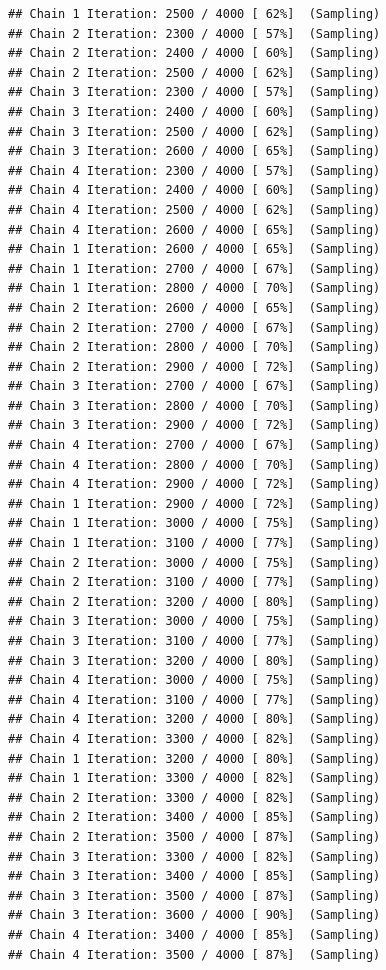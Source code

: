 \documentclass[
]{article}
\begin{document}
\begin{verbatim}
## Chain 1 Iteration: 2500 / 4000 [ 62%]  (Sampling) 
## Chain 2 Iteration: 2300 / 4000 [ 57%]  (Sampling) 
## Chain 2 Iteration: 2400 / 4000 [ 60%]  (Sampling) 
## Chain 2 Iteration: 2500 / 4000 [ 62%]  (Sampling) 
## Chain 3 Iteration: 2300 / 4000 [ 57%]  (Sampling) 
## Chain 3 Iteration: 2400 / 4000 [ 60%]  (Sampling) 
## Chain 3 Iteration: 2500 / 4000 [ 62%]  (Sampling) 
## Chain 3 Iteration: 2600 / 4000 [ 65%]  (Sampling) 
## Chain 4 Iteration: 2300 / 4000 [ 57%]  (Sampling) 
## Chain 4 Iteration: 2400 / 4000 [ 60%]  (Sampling) 
## Chain 4 Iteration: 2500 / 4000 [ 62%]  (Sampling) 
## Chain 4 Iteration: 2600 / 4000 [ 65%]  (Sampling) 
## Chain 1 Iteration: 2600 / 4000 [ 65%]  (Sampling) 
## Chain 1 Iteration: 2700 / 4000 [ 67%]  (Sampling) 
## Chain 1 Iteration: 2800 / 4000 [ 70%]  (Sampling) 
## Chain 2 Iteration: 2600 / 4000 [ 65%]  (Sampling) 
## Chain 2 Iteration: 2700 / 4000 [ 67%]  (Sampling) 
## Chain 2 Iteration: 2800 / 4000 [ 70%]  (Sampling) 
## Chain 2 Iteration: 2900 / 4000 [ 72%]  (Sampling) 
## Chain 3 Iteration: 2700 / 4000 [ 67%]  (Sampling) 
## Chain 3 Iteration: 2800 / 4000 [ 70%]  (Sampling) 
## Chain 3 Iteration: 2900 / 4000 [ 72%]  (Sampling) 
## Chain 4 Iteration: 2700 / 4000 [ 67%]  (Sampling) 
## Chain 4 Iteration: 2800 / 4000 [ 70%]  (Sampling) 
## Chain 4 Iteration: 2900 / 4000 [ 72%]  (Sampling) 
## Chain 1 Iteration: 2900 / 4000 [ 72%]  (Sampling) 
## Chain 1 Iteration: 3000 / 4000 [ 75%]  (Sampling) 
## Chain 1 Iteration: 3100 / 4000 [ 77%]  (Sampling) 
## Chain 2 Iteration: 3000 / 4000 [ 75%]  (Sampling) 
## Chain 2 Iteration: 3100 / 4000 [ 77%]  (Sampling) 
## Chain 2 Iteration: 3200 / 4000 [ 80%]  (Sampling) 
## Chain 3 Iteration: 3000 / 4000 [ 75%]  (Sampling) 
## Chain 3 Iteration: 3100 / 4000 [ 77%]  (Sampling) 
## Chain 3 Iteration: 3200 / 4000 [ 80%]  (Sampling) 
## Chain 4 Iteration: 3000 / 4000 [ 75%]  (Sampling) 
## Chain 4 Iteration: 3100 / 4000 [ 77%]  (Sampling) 
## Chain 4 Iteration: 3200 / 4000 [ 80%]  (Sampling) 
## Chain 4 Iteration: 3300 / 4000 [ 82%]  (Sampling) 
## Chain 1 Iteration: 3200 / 4000 [ 80%]  (Sampling) 
## Chain 1 Iteration: 3300 / 4000 [ 82%]  (Sampling) 
## Chain 2 Iteration: 3300 / 4000 [ 82%]  (Sampling) 
## Chain 2 Iteration: 3400 / 4000 [ 85%]  (Sampling) 
## Chain 2 Iteration: 3500 / 4000 [ 87%]  (Sampling) 
## Chain 3 Iteration: 3300 / 4000 [ 82%]  (Sampling) 
## Chain 3 Iteration: 3400 / 4000 [ 85%]  (Sampling) 
## Chain 3 Iteration: 3500 / 4000 [ 87%]  (Sampling) 
## Chain 3 Iteration: 3600 / 4000 [ 90%]  (Sampling) 
## Chain 4 Iteration: 3400 / 4000 [ 85%]  (Sampling) 
## Chain 4 Iteration: 3500 / 4000 [ 87%]  (Sampling) 

\end{verbatim}
\end{document}
